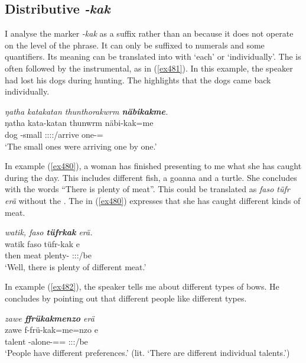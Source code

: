 \subsection{Distributive \emph{-kak}} \label{distributivekak}

I analyse the  marker \emph{-kak} as a suffix rather than an  because it does not operate on the level of the phrase. It can only be suffixed to numerals and some quantifiers. Its meaning can be translated into  with `each' or `individually'. The  is often followed by the instrumental, as in (\ref{ex481}). In this example, the speaker had lost his dogs during hunting. The  highlights that the dogs came back individually.

\begin{exe}
	\ex \emph{ŋatha katakatan thunthorakwrm \textbf{näbikakme}.}\\
	\gll ŋatha kata-katan thunwrm näbi-kak=me\\
	dog \Redup-small \Stpl:\Sbj:\Pst:\Dur:\Venit/arrive one-\Distr=\Ins\\
	\trans `The small ones were arriving one by one.'
	\label{ex481}
\end{exe}

In example (\ref{ex480}), a woman has finished presenting to me what she has caught during the day. This includes different fish, a goanna and a turtle. She concludes with the words ``There is plenty of meat''. This could be translated as \emph{faso tüfr erä} without the . The  in (\ref{ex480}) expresses that she has caught different kinds of meat.

\begin{exe}
	\ex \emph{watik, faso \textbf{tüfrkak} erä.}\\
	\gll watik faso tüfr-kak e\\
	then meat plenty-{\Distr} \Stpl:\Sbj:\Nonpast:\Ipfv/be\\
	\trans `Well, there is plenty of different meat.'
	\label{ex480}
\end{exe}
	 
In example (\ref{ex482}), the speaker tells me about different types of bows. He concludes by pointing out that different people like different types.
	
\begin{exe}
	\ex \emph{zawe \textbf{ffrükakmenzo} erä}\\
	\gll zawe f-frü-kak=me=nzo e\\
	talent \Redup-alone-\Distr=\Ins={\Only} \Stpl:\Sbj:\Nonpast:\Ipfv/be\\
	\trans `People have different preferences.' (lit. `There are different individual talents.')\\
	\label{ex482}
\end{exe}

